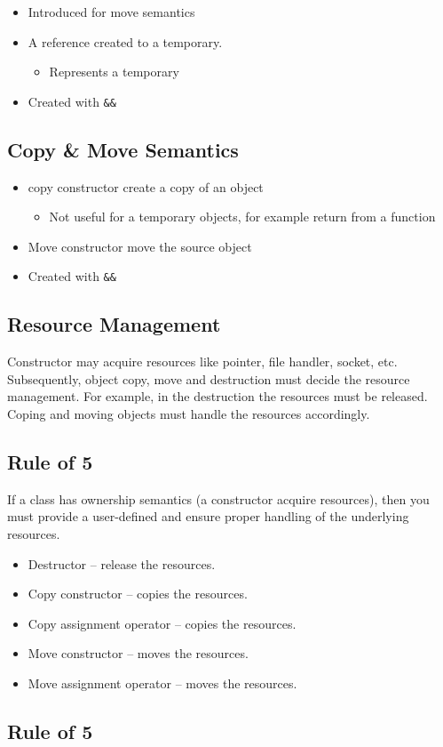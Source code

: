 \begin{itemize}
    \item Introduced for move semantics
    \item A reference created to a temporary.
    \begin{itemize}
      \item Represents a temporary
    \end{itemize}
    \item Created with \texttt{\&\&}
\end{itemize}

\subsection{ Copy \& Move Semantics} 
\begin{itemize}
    \item copy constructor create a copy of an object
      \begin{itemize}
        \item Not useful for a temporary objects, for example return from a function
      \end{itemize}
    \item Move constructor move the source object
    \item Created with \texttt{\&\&}
\end{itemize}

\subsection{Resource Management} 
Constructor may acquire resources like pointer, file handler, socket, etc. 
Subsequently, object copy, move and destruction must decide the resource management.
For example, in the destruction the resources must be released. Coping and moving objects must handle the resources accordingly.

\subsection{Rule of 5} 
If a class has ownership semantics (a constructor acquire resources), then you must provide a user-defined and ensure proper handling of the underlying resources.
\begin{itemize}
  \item Destructor -- release the resources.
  \item Copy constructor -- copies the resources.
  \item Copy assignment operator -- copies the resources.
  \item Move constructor -- moves the resources.
  \item Move assignment operator -- moves the resources.
\end{itemize}

\subsection{Rule of 5} 
